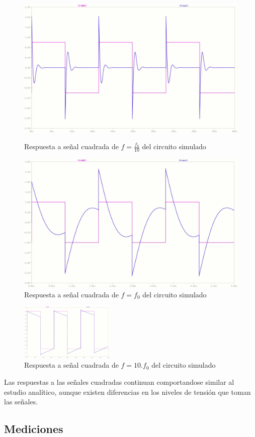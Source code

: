 \begin{figure}[H]
\begin{centering}

	\begin{minipage}[b]{.4\linewidth}
	\centering
	\includegraphics[width=1.1\linewidth]{imagenes/SimCuadrada_f:10}
	\caption{Respuesta a señal cuadrada de $f=\frac{f_0}{10}$ del circuito simulado}
	\end{minipage}
	\hfill
	\begin{minipage}[b]{.4\linewidth}
	\centering
	\includegraphics[width=1.1\linewidth]{imagenes/SimCuadrada_f}
	\caption{Respuesta a señal cuadrada de $f=f_0$ del circuito simulado}
	\end{minipage}
\end{centering}
\pagebreak
\end{figure}
\begin{centering}
\begin{figure}[H]
	\centering	
	\includegraphics[width=0.4\textwidth]{imagenes/SimCuadrada_10f}	\caption{Respuesta a señal cuadrada de $f=10.f_0$ del circuito simulado}
\end{figure}
\end{centering}
Las respuestas a las señales cuadradas continuan comportandose similar al estudio anal\'itico, aunque existen diferencias en los niveles de tensi\'on que toman las señales.

\subsection*{Mediciones}


